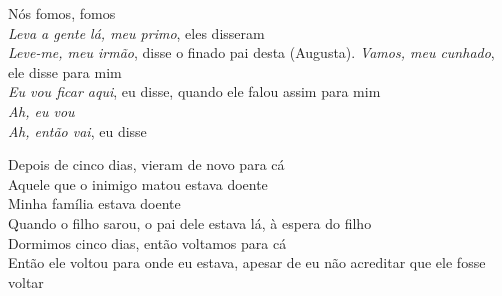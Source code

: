 \bigskip

\begin{linenumbers}\begingroup\raggedright
 
\noindent   Nós fomos, fomos\\
  \emph{Leva a gente lá, meu primo}, eles disseram\\
  \emph{Leve-me, meu irmão}, disse o finado pai desta (Augusta). \emph{Vamos, meu cunhado}, ele disse para mim\\
  \emph{Eu vou ficar aqui}, eu disse, quando ele falou assim para mim\\
  \emph{Ah, eu vou}\\
  \emph{Ah, então vai}, eu disse
 
\end{linenumbers}\endgroup

\bigskip

\begin{linenumbers}\begingroup\raggedright
 
\noindent   Depois de cinco dias, vieram de novo para cá\\
  Aquele que o inimigo matou estava doente\\
  Minha família estava doente\\
  Quando o filho sarou, o pai dele estava lá, à espera do filho\\
  Dormimos cinco dias, então voltamos para cá\\
  Então ele voltou para onde eu estava, apesar de eu não acreditar que
 ele fosse voltar

\end{linenumbers}\endgroup

